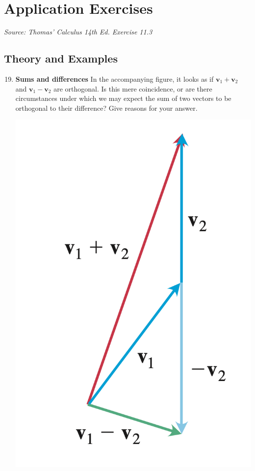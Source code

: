 \documentclass{report}
\begin{document}
\newpage

\section*{Application Exercises}
\textit{Source: Thomas' Calculus 14th Ed. Exercise 11.3}

\subsection*{Theory and Examples}

\begin{enumerate}
    \setcounter{enumi}{18}
    \item \textbf{Sums and differences} In the accompanying figure, it looks as if
          $\mathbf{v}_1+\mathbf{v}_2$ and $\mathbf{v}_1-\mathbf{v}_2$ are orthogonal. Is
          this mere coincidence, or are there circumstances under which we may expect the
          sum of two vectors to be orthogonal to their difference? Give reasons for your
          answer. \begin{center}
              \includegraphics[scale=0.3]{./assets/thomas12.3q19.png}
          \end{center}


\end{enumerate}
\end{document}
